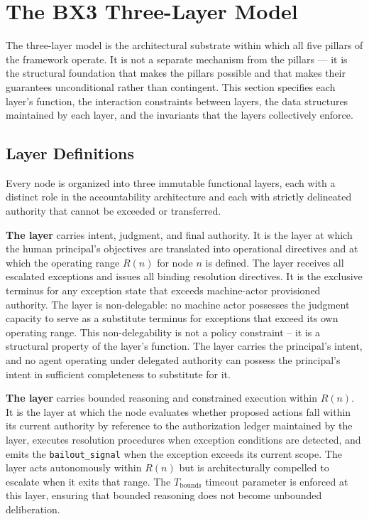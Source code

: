 \section{The BX3 Three-Layer Model}\label{sec:three-layer}

The \bxthree{} three-layer model is the architectural substrate within which all five
pillars of the framework operate.  It is not a separate mechanism from the pillars ---
it is the structural foundation that makes the pillars possible and that makes their
guarantees unconditional rather than contingent.  This section specifies each layer's
function, the interaction constraints between layers, the data structures maintained
by each layer, and the invariants that the layers collectively enforce.

\subsection{Layer Definitions}\label{sec:layer-definitions}

Every \bxthree{} node is organized into three immutable functional layers,
each with a distinct role in the accountability architecture and each with
strictly delineated authority that cannot be exceeded or transferred.

\textbf{The \purpose{} layer} carries intent, judgment, and final authority.
It is the layer at which the human principal's objectives are translated into
operational directives and at which the operating range $R(n)$ for node $n$ is
defined.  The \purpose{} layer receives all escalated exceptions and issues all
binding resolution directives.  It is the exclusive terminus for any exception
state that exceeds machine-actor provisioned authority.  The layer is
non-delegable: no machine actor possesses the judgment capacity to serve as a
substitute terminus for exceptions that exceed its own operating range.
This non-delegability is not a policy constraint -- it is a structural
property of the layer's function.  The \purpose{} layer carries the
principal's intent, and no agent operating under delegated authority can possess
the principal's intent in sufficient completeness to substitute for it.

\textbf{The \bounds{} layer} carries bounded reasoning and constrained execution
within $R(n)$.  It is the layer at which the node evaluates whether proposed
actions fall within its current authority by reference to the authorization
ledger maintained by the \fact{} layer, executes resolution procedures when
exception conditions are detected, and emits the \texttt{bailout\_signal} when
the exception exceeds its current scope.  The \bounds{} layer acts autonomously
within $R(n)$ but is architecturally compelled to escalate when it exits that
range.  The $T_{\text{bounds}}$ timeout parameter is enforced at this layer,
ensuring that bounded reasoning does not become unbounded deliberation.

